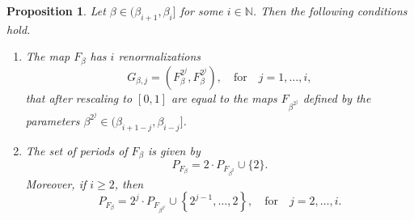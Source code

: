 \documentclass[10pt,reqno]{amsart}
\theoremstyle{plain}
\theoremstyle{assumption}
\theoremstyle{notation}
\theoremstyle{claim}
\theoremstyle{conj}
\theoremstyle{theorem}
\theoremstyle{proposition}
\newtheorem{proposition}{Proposition}[section]
\theoremstyle{corollary}
\begin{document}
\begin{proposition}
\label{prop:beta_seq}
    Let $\beta\in(\beta_{i+1},\beta_i]$ for some $i\in\mathbb{N}$. Then the following conditions hold.
    \begin{enumerate}
    \item\label{prop:beta_seq1} The map $F_{\beta}$ has $i$ renormalizations 
    $$
    G_{\beta,j}=(F^{2^j}_{\beta},F^{2^j}_{\beta}),\quad\text{for}\quad j=1,\ldots,i,
    $$ 
    that after rescaling to $[0,1]$ are equal to the maps $F_{\beta^{2^j}}$ defined by the parameters $\beta^{2^j}\in(\beta_{i+1-j},\beta_{i-j}]$.     
    \item\label{prop:beta_seq2} The set of periods of $F_{\beta}$ is given by
    $$
    P_{F_{\beta}}=2\cdot P_{F_{\beta^{2}}}\cup\{2\}.
    $$
    Moreover, if $i\geq2$, then
    $$
    P_{F_{\beta}}=2^{j}\cdot P_{F_{\beta^{2^j}}}\cup\left\lbrace2^{j-1},\ldots,2\right\rbrace,\quad\text{for}\quad j=2,\ldots,i.
    $$
    \end{enumerate}
\end{proposition}
\end{document}

